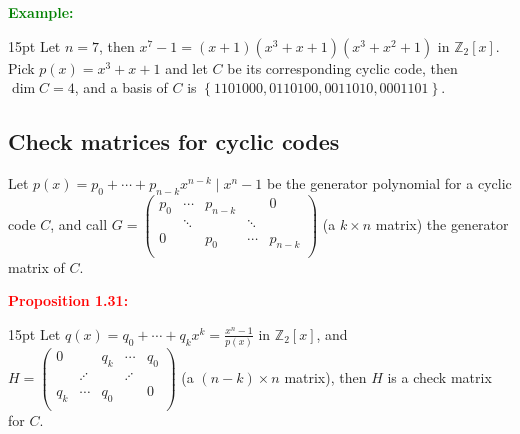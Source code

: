 \documentclass[12pt]{article}
\newcommand{\noparskip}{\vspace{-\parskip}}
\newenvironment{dent}
	{\begin{adjustwidth}{15pt}{}\noparskip}
	{\end{adjustwidth}}
\newenvironment{result}[1]
	{\textcolor{Red}{\textbf{#1:}}\begin{dent}}
	{\end{dent}}
\newenvironment{example}
	{\textcolor{Green}{\textbf{Example:}}\begin{dent}}
	{\end{dent}}
\newcommand{\set}[1]{\left\{ #1 \right\}}
\newcommand{\Z}{\mathbb{Z}}
\newcommand{\Ztwox}{\Z_2[x]}
\begin{document}
\begin{example}
Let $n = 7$, then $x^7 - 1 = (x + 1)(x^3 + x + 1)(x^3 + x^2 + 1)$ in $\Ztwox$. Pick $p(x) = x^3 + x + 1$ and let $C$ be its corresponding cyclic code, then $\dim C = 4$, and a basis of $C$ is $\set{1101000, 0110100, 0011010, 0001101}$.
\end{example}

\subsection{Check matrices for cyclic codes}

Let $p(x) = p_0 + \cdots + p_{n - k} x^{n - k} \mid x^n - 1$ be the generator polynomial for a cyclic code $C$, and call $G = \begin{pmatrix}
p_0 & \cdots & p_{n - k} &           &            0 \\
      & \ddots &               & \ddots &               \\
   0 &           &         p_0 & \cdots & p_{n - k} \\
\end{pmatrix}$ (a $k \times n$ matrix) the generator matrix of $C$.

\begin{result}{Proposition 1.31}
Let $q(x) = q_0 + \cdots + q_k x^k = \frac{x^n - 1}{p(x)}$ in $\Ztwox$, and $H = \begin{pmatrix}
   0 &            & q_k &  \cdots & q_0 \\
      & \iddots &       & \iddots &       \\
q_k &  \cdots & q_0 &           &     0 \\
\end{pmatrix}$ (a $(n - k) \times n$ matrix), then $H$ is a check matrix for $C$.
\end{result}
\end{document}
